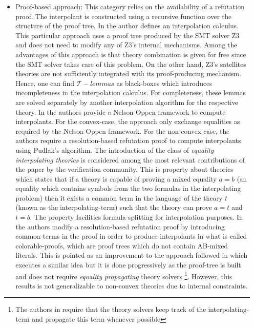 \begin{itemize}
  \item Proof-based approach: This category relies on the availability
    of a refutation proof.  The interpolant is constructed using a
    recursive function over the structure of the proof
    tree. In \cite{10.1007/978-3-540-24730-2_2,mcmillan2011interpolants}
    the author defines an interpolation calculus. This particular
    approach uses a proof tree produced by the SMT solver Z3 
    and does not need to modify any of Z3's internal mechanisms.
    Among the advantages of this approach is that
    theory combination is given for free since the SMT solver takes care of this
    problem. On the other hand, Z3's
    satellites theories are not sufficiently integrated with its
    proof-producing mechanism. Hence, one can find $\mathcal{T}-lemmas$
    as black-boxes which introduces incompleteness in the
    interpolation calculus. For completeness, these lemmas are 
    solved separately by another interpolation algorithm for the respective
    theory. 
    In \cite{10.1007/11532231_26} the authors provide a Nelson-Oppen framework
    to compute interpolants. For the convex-case, the approach only 
    exchange equalities as required by the Nelson-Oppen framework. For
    the non-convex case, the authors require a resolution-based refutation proof
    to compute interpolants using Pudlak's algorithm. The introduction of the
    class of \emph{equality interpolating theories} is 
    considered among the most relevant contributions of the paper 
    by the verification community. This is property about theories which states
    that if a theory is capable of proving a mixed equality $a = b$ (an equality
    which contains symbols from the two formulas in the interpolating problem)
    then it exists a common term in the language of the theory $t$ (known as
    the interpolating-term) such that 
    the theory can prove $a = t$ and $t = b$. The property facilities 
    formula-splitting for interpolation purposes.
    In \cite{10.1007/978-3-642-00768-2_34} the authors modify a 
    resolution-based refutation proof by introducing common-terms in 
    the proof in order to produce interpolants in what is called
    colorable-proofs, which are proof trees which do not contain AB-mixed
    literals. This is pointed as an improvement to the approach followed 
    in \cite{10.1007/11532231_26} which executes a similar idea but it is done 
    progressively as the proof-tree is built and does not require 
   \emph{equality propagating} theory solvers
    \footnote{The authors in \cite{10.1007/11532231_26} require that 
      the theory solvers keep track of the interpolating-term 
      and propagate this term whenever
    possible}. 
    However, this results is not generalizable
    to non-convex theories due to internal constraints.


\end{itemize}
